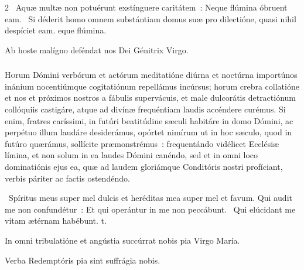\documentclass[9pt,twoside]{extarticle}
\begin{document}
\begin{multicols}{2}
\smallskip
{}~Aquæ multæ non potuérunt exstínguere caritátem~: \textred{*} Neque flúmina óbruent eam. ~Si déderit homo omnem substántiam domus suæ pro dilectióne, quasi nihil despíciet eam. eque flúmina.

\smallskip
\small {} Ab hoste malígno deféndat nos Dei Génitrix Virgo.

\normalsize
\subsubsection*{\center \normalfont {}}
\lettrine{H}{o}rum Dómini verbórum et actórum meditatióne diúrna et noctúrna importúnos inánium nocentiúmque cogitatiónum repellámus incúrsus; horum crebra collatióne et nos et próximos nostros a fábulis supervácuis, et male dulcorátis detractiónum collóquiis castigáre, atque ad divínæ frequéntiam laudis accéndere curémus.
Si enim, fratres caríssimi, in futúri beatitúdine sæculi habitáre in domo Dómini, ac perpétuo illum laudáre desiderámus, opórtet nimírum ut in hoc sæculo, quod in futúro quærámus, sollícite præmonstrémus~: frequentándo vidélicet Ecclésiæ límina, et non solum in ea laudes Dómini canéndo, sed et in omni loco dominatiónis ejus ea, quæ ad laudem gloriámque Conditóris nostri profíciant, verbis páriter ac factis ostendéndo.

\smallskip
{}~Spíritus meus super mel dulcis et heréditas mea super mel et favum. Qui audit me non confundétur~: \textred{*} Et qui operántur in me non peccábunt. ~Qui elúcidant me vitam ætérnam habébunt. t.

\smallskip
\small {} In omni tribulatióne et angústia succúrrat nobis pia Virgo María.

 Verba Redemptóris pia sint suffrágia nobis. \normalsize


\end{multicols}
\end{document}
